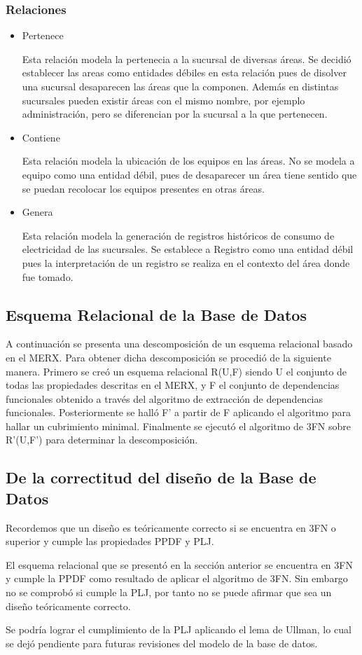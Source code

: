 \documentclass{article}
\begin{document}
\subsubsection{Relaciones}
\begin{itemize}
\item Pertenece

Esta relación modela la pertenecia a la sucursal de diversas áreas. Se decidió establecer las areas como entidades débiles
en esta relación pues de disolver una sucursal desaparecen las áreas que la componen. Además en distintas sucursales pueden
existir áreas con el mismo nombre, por ejemplo administración, pero se diferencian por la sucursal a la que pertenecen.

\item Contiene

Esta relación modela la ubicación de los equipos en las áreas. No se modela a equipo como una entidad débil, pues de desaparecer un área
tiene sentido que se puedan recolocar los equipos presentes en otras áreas.

\item Genera

Esta relación modela la generación de registros históricos de consumo de electricidad de las sucursales. Se establece a Registro como
una entidad débil pues la interpretación de un registro se realiza en el contexto del área donde fue tomado.

\end{itemize}

\subsection{Esquema Relacional de la Base de Datos}
A continuación se presenta una descomposición de un esquema relacional basado en el MERX. Para obtener dicha descomposición se procedió de la siguiente manera. Primero se creó un esquema relacional R(U,F) siendo U el conjunto de todas las propiedades descritas
en el MERX, y F el conjunto de dependencias funcionales obtenido a través del algoritmo de extracción de dependencias funcionales. Posteriormente se halló F' a partir de F aplicando el algoritmo para hallar un cubrimiento minimal. Finalmente se ejecutó el algoritmo de
3FN sobre R'(U,F') para determinar la descomposición.

\subsection{De la correctitud del diseño de la Base de Datos}
Recordemos que un diseño es teóricamente correcto si se encuentra en 3FN o superior y cumple las propiedades PPDF y PLJ.

El esquema relacional que se presentó en la sección anterior se encuentra en 3FN y cumple la PPDF como resultado de aplicar el algoritmo
de 3FN. Sin embargo no se comprobó si cumple la PLJ, por tanto no se puede afirmar que sea un diseño teóricamente correcto.

Se podría lograr el cumplimiento de la PLJ aplicando el lema de Ullman, lo cual se dejó pendiente para futuras revisiones del modelo de la
base de datos.
\end{document}
